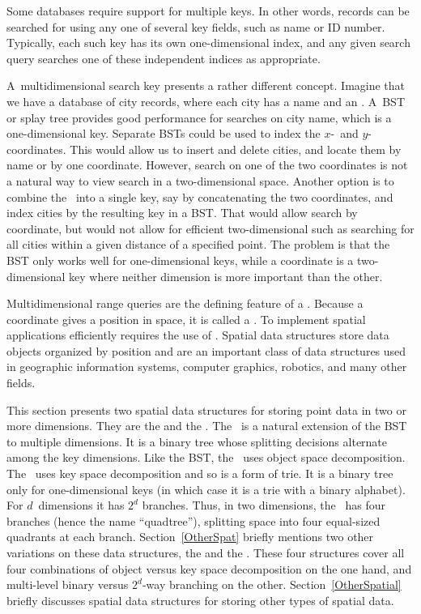 Some databases require support for multiple keys.
In other words, records can be searched for using any one of several
key fields, such as name or ID number.
Typically, each such key has its own one-dimensional index,
and any given search query searches one of these independent
indices as appropriate.

A~multidimensional
search key presents a rather different concept.
Imagine that we have a database of city records, where
each city has a name and an \XYcoord.
A~BST or splay tree provides good performance for searches on city
name, which is a one-dimensional key.
Separate BSTs could be used to index the $x$-~and $y$-coordinates.
This would allow us to insert and delete cities, and locate them by
name or by one coordinate.
However, search on one of the two coordinates is not a natural way to
view search in a two-dimensional space.
Another option is to combine the \XYcoords\ into a single
key, say by concatenating the two coordinates, and
index cities by the resulting key in a BST.
That would allow search by coordinate, but would not allow for
efficient two-dimensional  such as searching for
all cities within a given distance of a specified point.
The problem is that the BST only works well for one-dimensional keys,
while a coordinate is a two-dimensional key where neither dimension
is more important than the other.

Multidimensional range queries are the defining feature
of a  . %
Because a coordinate gives a position in space, it is called
a .
To implement spatial applications efficiently requires the use of
.
Spatial data structures store data objects organized by position and
are an important class of data structures used in geographic
information systems, computer graphics, robotics, and many other
fields.

This section presents two spatial data structures for storing
point data in two or more dimensions.
They are the  and the
.
The \KDtree\ is a natural extension of the BST to
multiple dimensions.
It is a binary tree whose splitting decisions alternate among the
key dimensions.
Like the BST, the \KDtree\ uses object space decomposition.
The \PRquad\ uses key space decomposition and so is a form of trie.
It is a binary tree only for one-dimensional keys (in which case it
is a trie with a binary alphabet).
For $d$~dimensions it has $2^d$ branches.
Thus, in two dimensions, the \PRquad\ has four branches (hence the
name ``quadtree''), splitting space into four equal-sized
quadrants at each branch.
Section~\ref{OtherSpat} briefly mentions two other variations on
these data structures, the  and the
.
These four structures cover all four combinations of object versus key
space decomposition on the one hand, and multi-level binary versus
\(2^d\)-way branching on the other.
Section~\ref{OtherSpatial} briefly discusses spatial data structures
for storing other types of spatial data.

